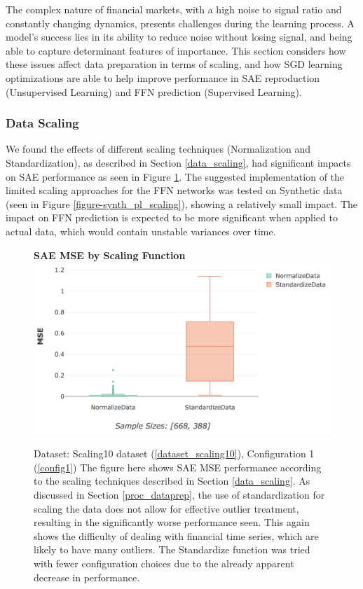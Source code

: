\documentclass[a4paper,11pt,oneside]{article}
\theoremstyle{plain}
\theoremstyle{definition}
\begin{document}
	The complex nature of financial markets, with a high noise to signal ratio and constantly changing dynamics, presents challenges during the learning process. A model's success lies in its ability to reduce noise without losing signal, and being able to capture determinant features of importance. This section considers how these issues affect data preparation in terms of scaling, and how SGD learning optimizations are able to help improve performance in SAE reproduction (Unsupervised Learning) and FFN prediction (Supervised Learning).
	
	\subsubsection{Data Scaling}
	
	We found the effects of different scaling techniques (Normalization and Standardization), as described in Section \ref{data_scaling}, had significant impacts on SAE performance as seen in Figure \ref{figure-actual_mse_scaling}. The suggested implementation of the limited scaling approaches for the FFN networks was tested on Synthetic data (seen in Figure \ref{figure-synth_pl_scaling}), showing a relatively small impact. The impact on FFN prediction is expected to be more significant when applied to actual data, which would contain unstable variances over time.
		
	\begin{figure}[H]
		\centering 
		\textbf{SAE MSE by Scaling Function}
		\includegraphics[scale=0.4]{images/results/8_6_complexity/mse_scaling.png}
		\caption[SAE MSE by Scaling Function]
		{Dataset: Scaling10 dataset (\ref{dataset_scaling10}), Configuration 1 (\ref{config1})
			\newline The figure here shows SAE MSE performance according to the scaling techniques described in Section \ref{data_scaling}. As discussed in Section \ref{proc_dataprep}, the use of standardization for scaling the data does not allow for effective outlier treatment, resulting in the significantly worse performance seen. This again shows the difficulty of dealing with financial time series, which are likely to have many outliers. The Standardize function was tried with fewer configuration choices due to the already apparent decrease in performance.}
		\label{figure-actual_mse_scaling}
	\end{figure}
\end{document}
